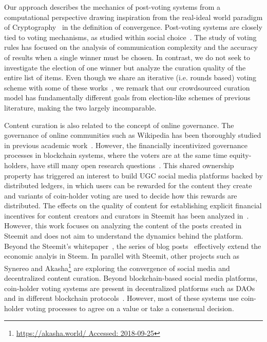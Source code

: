 Our approach  describes the mechanics of post-voting systems from a computational perspective  drawing inspiration from the real-ideal world paradigm of Cryptography~\cite{goldreich1999foundations,lindell}  in the definition of convergence. 
Post-voting systems are closely tied to voting mechanisms, as studied within  social choice~\cite{lu2011robust,conitzer2005communication,xia2010compilation}. The study of voting rules has focused on the analysis of communication complexity and the accuracy of results when a single winner must be chosen. In contrast, we do not seek to investigate the election of one winner but analyze the curation quality of the entire list of items. Even though we share an iterative (i.e. rounds based) voting scheme with some of these works~\cite{kalech2011practical}, we remark that our crowdsourced curation model has fundamentally different goals from election-like schemes of previous literature, making the two largely incomparable. 

  Content curation is also related to the concept of online governance. The governance of online communities such as Wikipedia has been thoroughly studied in previous academic work~\cite{leskovec2010governance,forte2008scaling}. However, the financially incentivized governance processes in blockchain systems, where the voters are at the same time equity-holders, have still many open research questions~\cite{vitalik,ehrsam}. This shared ownership property has triggered an interest to build UGC social media platforms backed by distributed ledgers, in which users can be rewarded for the content they create and variants of coin-holder voting are used to decide how this rewards are distributed.
  The effects on the quality of content for establishing explicit financial incentives for content creators and curators in Steemit has been analyzed in~\cite{thelwall2017can}.
  However, this work focuses on analyzing the content of the posts created in Steemit and does not aim to understand the dynamics behind the platform. Beyond the Steemit's whitepaper~\cite{steemit}, the series of blog posts~\cite{curationRewards,selfvoters} effectively extend the economic analyis in Steem. In parallel with Steemit, other projects such as Synereo\cite{synereo} and Akasha\footnote{\url{https://akasha.world/ Accessed: 2018-09-25}} are exploring the convergence of social media and decentralized content curation.
   Beyond blockchain-based social media platforms, coin-holder voting systems are present in decentralized platforms such as DAOs~\cite{darkdaos} and in different blockchain protocols~\cite{dash,tezos}. However, most of these systems use coin-holder voting processes to agree on a value or take a consensual decision.
